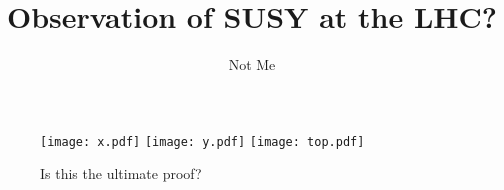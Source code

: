 \documentclass{article}
\title{Observation of SUSY at the LHC?}
\author{Not Me}
\begin{document}
\maketitle

\begin{abstract}
    \lipsum[1]
\end{abstract}

\begin{figure}[h]
    \texttt{[image: x.pdf]}
    \texttt{[image: y.pdf]}
    \texttt{[image: top.pdf]}
    \caption{Is this the ultimate proof?}
\end{figure}
\end{document}
